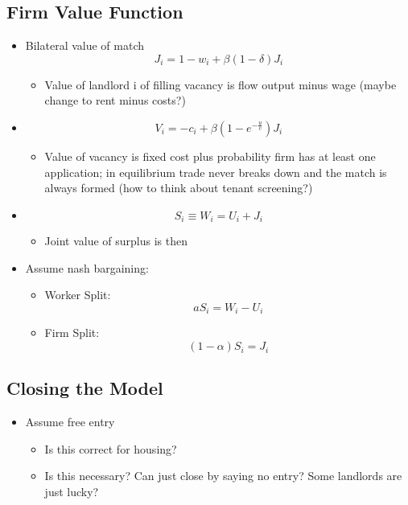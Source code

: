 \documentclass{article}
\begin{document}
\subsection{Firm Value Function}
\begin{itemize}
    \item Bilateral value of match \begin{equation}
        J_i = 1 - w_i + \beta(1 - \delta)J_i
    \end{equation} 
    \begin{itemize}
        \item Value of landlord i of filling vacancy is flow output minus wage (maybe change to rent minus costs?)
    \end{itemize}
    \item \begin{equation}\label{eq:job-value}
        V_i = -c_i + \beta(1  - e^{-\frac{u}{v}})J_i
    \end{equation}
    \begin{itemize}
        \item Value of vacancy is fixed cost plus probability firm has at least one application; in equilibrium trade never breaks down and the match is always formed (how to think about tenant screening?)
    \end{itemize}
    \item \begin{equation}\label{eq:surplus-value}
        S_i \equiv W_i = U_i + J_i
    \end{equation}
    \begin{itemize}
        \item Joint value of surplus is then 
    \end{itemize}
    \item Assume nash bargaining:
    \begin{itemize}
        \item Worker Split: \begin{equation}\label{eq:nash-worker}
            aS_i = W_i - U_i
        \end{equation}
        \item Firm Split: \begin{equation}
            (1-\alpha)S_i = J_i
        \end{equation}
    \end{itemize}
\end{itemize}

\subsection{Closing the Model}
\begin{itemize}
    \item Assume free entry
    \begin{itemize}
        \item Is this correct for housing?
        \item Is this necessary? Can just close by saying no entry? Some landlords are just lucky?
    \end{itemize}
\end{itemize}
\end{document}

